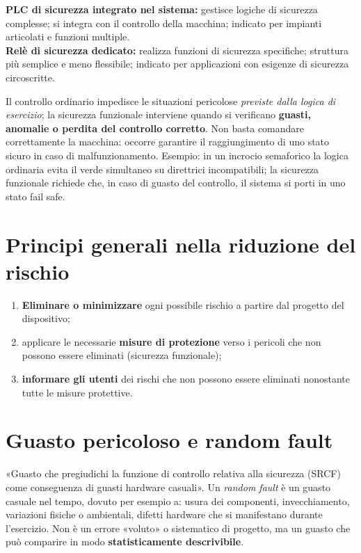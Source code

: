 \begin{note}
\textbf{PLC di sicurezza integrato nel sistema:} gestisce logiche di sicurezza complesse; si integra con il controllo della macchina; indicato per impianti articolati e funzioni multiple.\\
\textbf{Relè di sicurezza dedicato:} realizza funzioni di sicurezza specifiche; struttura più semplice e meno flessibile; indicato per applicazioni con esigenze di sicurezza circoscritte.
\end{note}

\begin{intuition}
Il controllo ordinario impedisce le situazioni pericolose \emph{previste dalla logica di esercizio}; la sicurezza funzionale interviene quando si verificano \textbf{guasti, anomalie o perdita del controllo corretto}. Non basta comandare correttamente la macchina: occorre garantire il raggiungimento di uno stato sicuro in caso di malfunzionamento. Esempio: in un incrocio semaforico la logica ordinaria evita il verde simultaneo su direttrici incompatibili; la sicurezza funzionale richiede che, in caso di guasto del controllo, il sistema si porti in uno stato fail safe.
\end{intuition}

\section{Principi generali nella riduzione del rischio}
\begin{enumerate}
    \item \textbf{Eliminare o minimizzare} ogni possibile rischio a partire dal progetto del dispositivo;
    \item applicare le necessarie \textbf{misure di protezione} verso i pericoli che non possono essere eliminati (sicurezza funzionale);
    \item \textbf{informare gli utenti} dei rischi che non possono essere eliminati nonostante tutte le misure protettive.
\end{enumerate}

\section{Guasto pericoloso e random fault}
\begin{defn}
«Guasto che pregiudichi la funzione di controllo relativa alla sicurezza (SRCF) come conseguenza di guasti hardware casuali». Un \emph{random fault} è un guasto casuale nel tempo, dovuto per esempio a: usura dei componenti, invecchiamento, variazioni fisiche o ambientali, difetti hardware che si manifestano durante l'esercizio. Non è un errore «voluto» o sistematico di progetto, ma un guasto che può comparire in modo \textbf{statisticamente descrivibile}.
\end{defn}

